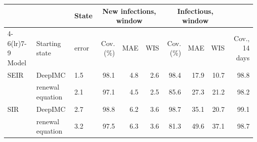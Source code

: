 \begin{tabular}{lllrrrrrrr}
\toprule
 &  & State & \multicolumn{3}{c}{New infections, window} & \multicolumn{3}{c}{Infectious, window} &  \\
\cmidrule(lr){4-6}\cmidrule(lr){7-9}
Model & Starting state & error & Cov. (\%) & MAE & WIS & Cov. (\%) & MAE & WIS & Cov., 14 days \\
\midrule
SEIR & DeepIMC & 1.5 & 98.1 & 4.8 & 2.6 & 98.4 & 17.9 & 10.7 & 98.8 \\
 & renewal equation & 2.1 & 97.1 & 4.5 & 2.5 & 85.6 & 27.3 & 21.2 & 98.2 \\
\midrule
SIR & DeepIMC & 2.7 & 98.8 & 6.2 & 3.6 & 98.7 & 35.1 & 20.7 & 99.1 \\
 & renewal equation & 3.2 & 97.5 & 6.3 & 3.6 & 81.3 & 49.6 & 37.1 & 98.7 \\
\bottomrule
\end{tabular}
